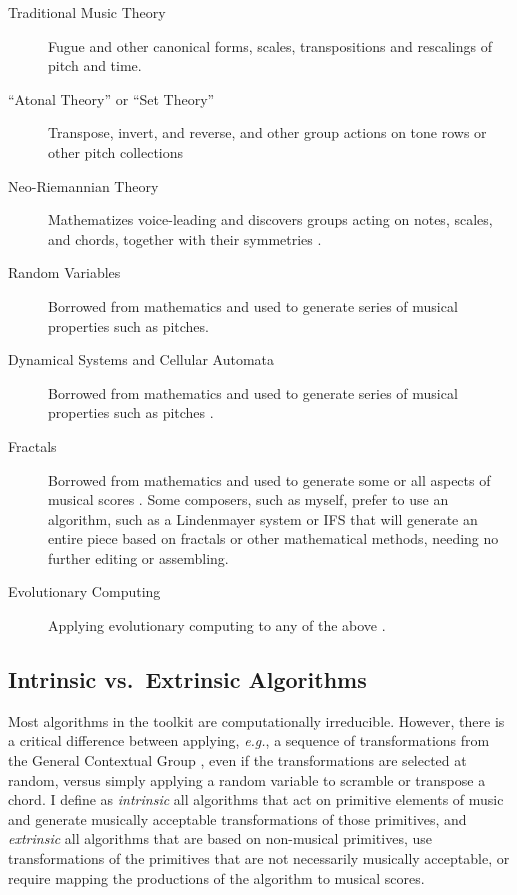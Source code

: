 \documentclass[11pt,papersize=a4]{scrartcl}
\begin{document}
\begin{description}
\item[Traditional Music Theory] Fugue and other canonical forms, scales, transpositions and rescalings of pitch and time.
\item[``Atonal Theory'' or ``Set Theory''] Transpose, invert, and reverse, and other group actions on tone rows or other pitch collections \parencite{rahn1991basic}
\item[Neo-Riemannian Theory] Mathematizes voice-leading and discovers groups acting on notes, scales, and chords, together with their symmetries \parencite{geometryofchords, tymoczko2006geometry, callender2008generalized}.
\item[Random Variables] Borrowed from mathematics and used to generate series of musical properties such as pitches.
\item[Dynamical Systems and Cellular Automata] Borrowed from mathematics and used to generate series of musical properties such as pitches \parencite{Miranda1993}.
\item[Fractals] Borrowed from mathematics and used to generate some or all aspects of musical scores \parencite{miranda2001composing, madden2007fractals}. Some composers, such as myself, prefer to use an algorithm, such as a Lindenmayer system \parencite{algorithmicbeautyofplants, prusinkiewicz1986sgs,  fractalmusicwithstringrewritinggrammars} or IFS \parencite{fractalseverywhere, ifsmusic} that will generate an entire piece based on fractals or other mathematical methods, needing no further editing or assembling. 
\item[Evolutionary Computing] Applying evolutionary computing to any of the above \parencite{miranda2007evolutionary}.
\end{description}

\subsection*{Intrinsic vs.\ Extrinsic Algorithms}

Most algorithms in the toolkit are computationally irreducible. However, there is a critical difference between applying, \emph{e.g.}, a sequence of transformations from the General Contextual Group \parencite{fiore2005gcg}, even if the transformations are selected at random, versus simply applying a random variable to scramble or transpose a chord. I define as \emph{intrinsic} all algorithms that act on primitive elements of music and generate musically acceptable transformations of those primitives, and \emph{extrinsic} all algorithms that are based on non-musical primitives, use transformations of the primitives that are not necessarily musically acceptable, or require mapping the productions of the algorithm to musical scores.
\end{document}
